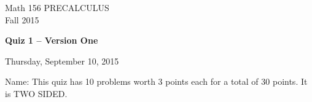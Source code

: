 \documentclass[11pt]{article}
\begin{document}
\begin{center}
\vspace{2in}

\huge{Math 156 PRECALCULUS \\
Fall 2015}

\vfill

\huge{\bf{Quiz 1 -- Version One}}\\

\vspace{0.5in}

\large{Thursday, September 10, 2015}\\

\vfill


{\huge{Name:{\underline{\hspace{2in}}}}}
\vfill
This quiz has 10 problems worth 3 points each for a total of 30 points. It is TWO SIDED. 
\vfill
\end{center}
\newpage
\restoregeometry
\end{document}
